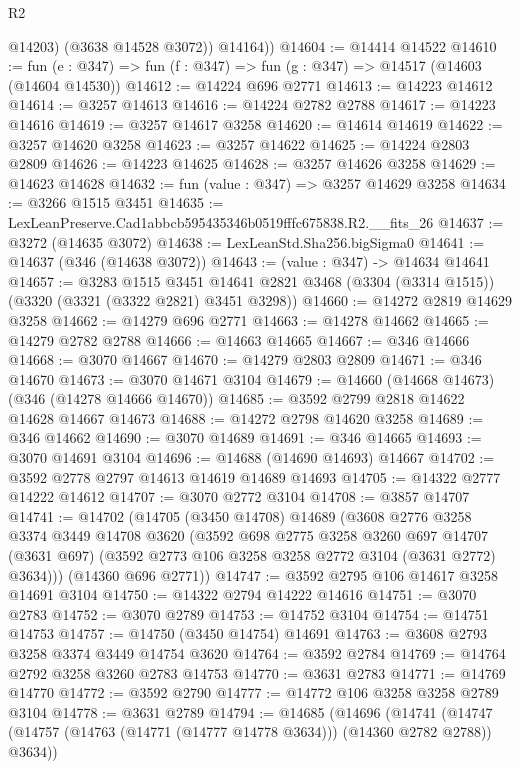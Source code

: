 \begin{lexlean}{R2}
\begin{coremodule}
            @14203)
          (@3638 @14528 @3072))
        @14164))
@14604 := @14414 @14522
@14610 := fun (e : @347) => fun (f : @347) => fun (g : @347) => @14517 (@14603 (@14604 @14530))
@14612 := @14224 @696 @2771
@14613 := @14223 @14612
@14614 := @3257 @14613
@14616 := @14224 @2782 @2788
@14617 := @14223 @14616
@14619 := @3257 @14617 @3258
@14620 := @14614 @14619
@14622 := @3257 @14620 @3258
@14623 := @3257 @14622
@14625 := @14224 @2803 @2809
@14626 := @14223 @14625
@14628 := @3257 @14626 @3258
@14629 := @14623 @14628
@14632 := fun (value : @347) => @3257 @14629 @3258
@14634 := @3266 @1515 @3451
@14635 := LexLeanPreserve.Cad1abbcb595435346b0519fffc675838.R2.__fits_26
@14637 := @3272 (@14635 @3072)
@14638 := LexLeanStd.Sha256.bigSigma0
@14641 := @14637 (@346 (@14638 @3072))
@14643 := (value : @347) -> @14634 @14641
@14657 := @3283
    @1515
    @3451
    @14641
    @2821
    @3468
    (@3304 (@3314 @1515))
    (@3320 (@3321 (@3322 @2821) @3451 @3298))
@14660 := @14272 @2819 @14629 @3258
@14662 := @14279 @696 @2771
@14663 := @14278 @14662
@14665 := @14279 @2782 @2788
@14666 := @14663 @14665
@14667 := @346 @14666
@14668 := @3070 @14667
@14670 := @14279 @2803 @2809
@14671 := @346 @14670
@14673 := @3070 @14671 @3104
@14679 := @14660 (@14668 @14673) (@346 (@14278 @14666 @14670))
@14685 := @3592 @2799 @2818 @14622 @14628 @14667 @14673
@14688 := @14272 @2798 @14620 @3258
@14689 := @346 @14662
@14690 := @3070 @14689
@14691 := @346 @14665
@14693 := @3070 @14691 @3104
@14696 := @14688 (@14690 @14693) @14667
@14702 := @3592 @2778 @2797 @14613 @14619 @14689 @14693
@14705 := @14322 @2777 @14222 @14612
@14707 := @3070 @2772 @3104
@14708 := @3857 @14707
@14741 := @14702
    (@14705
      (@3450 @14708)
      @14689
      (@3608
        @2776
        @3258
        @3374
        @3449
        @14708
        @3620
        (@3592
          @698
          @2775
          @3258
          @3260
          @697
          @14707
          (@3631 @697)
          (@3592 @2773 @106 @3258 @3258 @2772 @3104 (@3631 @2772) @3634)))
      (@14360 @696 @2771))
@14747 := @3592 @2795 @106 @14617 @3258 @14691 @3104
@14750 := @14322 @2794 @14222 @14616
@14751 := @3070 @2783
@14752 := @3070 @2789
@14753 := @14752 @3104
@14754 := @14751 @14753
@14757 := @14750 (@3450 @14754) @14691
@14763 := @3608 @2793 @3258 @3374 @3449 @14754 @3620
@14764 := @3592 @2784
@14769 := @14764 @2792 @3258 @3260 @2783 @14753
@14770 := @3631 @2783
@14771 := @14769 @14770
@14772 := @3592 @2790
@14777 := @14772 @106 @3258 @3258 @2789 @3104
@14778 := @3631 @2789
@14794 := @14685
    (@14696
      (@14741 (@14747 (@14757 (@14763 (@14771 (@14777 @14778 @3634))) (@14360 @2782 @2788)) @3634))

\end{coremodule}
\end{lexlean}
